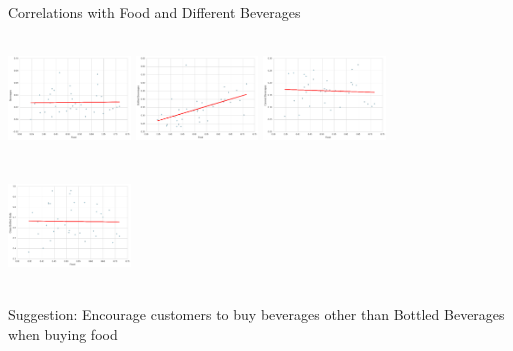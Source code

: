 \documentclass[compress,blue]{beamer}
\begin{document}
\begin{frame}{Correlations with Food and Different Beverages}
\begin{rows}
\row{\textwidth}
\includegraphics[width=3.25cm,height=3.25cm]{Bev&Food}
\hspace{1.5cm}
\includegraphics[width=3.25cm,height=3.25cm]{Bottled&Food}
\row{\textwidth}
\includegraphics[width=3.25cm,height=3.25cm]{Canned&Food}
\hspace{1.5cm}
\includegraphics[width=3.25cm,height=3.25cm]{Glass&Food}
\end{rows}
\newline
Suggestion: Encourage customers to buy beverages other than Bottled Beverages
when buying food
\end{frame}
\end{document}
